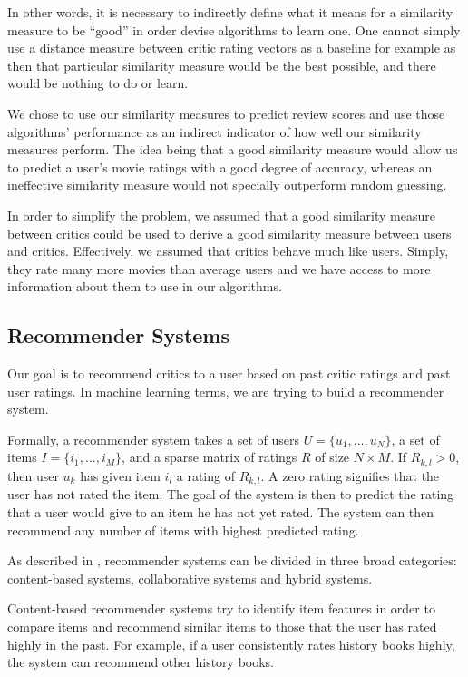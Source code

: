 \documentclass[10.5pt]{article}
\begin{document}
In other words, it is necessary to indirectly define what it means for a
similarity measure to be ``good'' in order devise algorithms to learn one. One
cannot simply use a distance measure between critic rating vectors as a
baseline for example as then that particular similarity measure would be the
best possible, and there would be nothing to do or learn.

We chose to use our similarity measures to predict review scores and use those
algorithms' performance as an indirect indicator of how well our similarity
measures perform. The idea being that a good similarity measure would allow
us to predict a user's movie ratings with a good degree of accuracy, whereas an
ineffective similarity measure would not specially outperform random guessing.

In order to simplify the problem, we assumed that a good similarity measure
between critics could be used to derive a good similarity measure
between users and critics. Effectively, we assumed that critics behave much
like users. Simply, they rate many more movies than average users and we have
access to more information about them to use in our algorithms.

\subsection{Recommender Systems}

Our goal is to recommend critics to a user
based on past critic ratings and past user ratings. In machine learning terms,
we are trying to build a recommender system.

Formally, a recommender system takes a set of users $U = \{u_1, ..., u_N\}$, a
set of items $I = \{i_1, ..., i_M\}$, and a sparse matrix of ratings
$R$ of size $N \times M$. If $R_{k,l} > 0$, then user $u_k$ has given item
$i_l$ a rating of $R_{k,l}$. A zero rating signifies that the
user has not rated the item. The goal of the system is then to predict the
rating that a user would give to an item he has not yet rated. The system can
then recommend any number of items with highest predicted rating.

As described in \cite{Survey05}, recommender systems can be divided in three
broad categories: content-based systems, collaborative systems and hybrid
systems. 

Content-based recommender systems try to identify item features in order to
compare items and recommend similar items to those that the user has rated
highly in the past.  For example, if a user consistently rates history books
highly, the system can recommend other history books.
\end{document}
